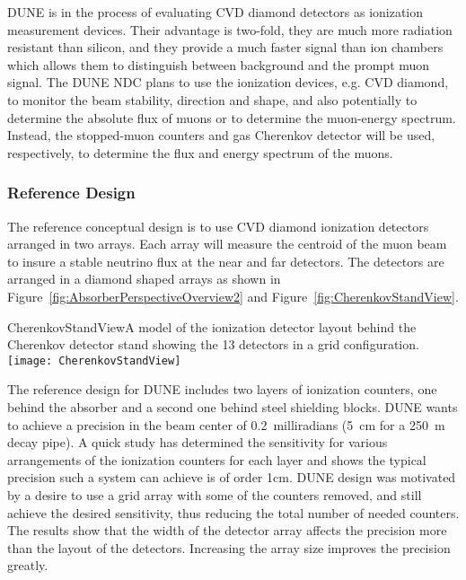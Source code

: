 DUNE is in the process of evaluating CVD diamond detectors
as ionization measurement devices. Their advantage is two-fold, they are much more
radiation resistant than silicon, and they provide a much faster signal than ion chambers
which allows them to distinguish between background and the prompt muon signal. 
The DUNE NDC plans to use the ionization devices, e.g. CVD diamond, to monitor
the beam stability, direction and shape, 
and also potentially to determine the absolute flux of muons or to determine the 
muon-energy spectrum. Instead, the stopped-muon counters %
and gas Cherenkov detector %
will be used, respectively, to determine the flux and energy
spectrum of the muons. 

\subsubsection{Reference Design}

The reference conceptual design is to use CVD diamond ionization detectors arranged in two
arrays. Each array will measure the centroid of the muon beam to insure a stable neutrino flux
at the near and far detectors. The detectors are arranged in a diamond shaped arrays as shown in 
Figure~\ref{fig:AbsorberPerspectiveOverview2} and Figure~\ref{fig:CherenkovStandView}.

\begin{cdrfigure}{CherenkovStandView}{A model of the ionization detector layout behind the Cherenkov detector stand showing the 13 detectors in a grid configuration.}
\texttt{[image: CherenkovStandView]}

\end{cdrfigure}

The reference design for DUNE includes two layers of ionization counters, one 
behind the absorber and a second one behind steel shielding blocks. 
DUNE wants to achieve a precision in the beam center of 0.2~milliradians
(5~cm for a 250~m decay pipe). A quick study has 
determined the sensitivity for various arrangements of the ionization counters for each layer and
shows the typical precision such a system can achieve is of order 1cm.
DUNE design was motivated by a desire to use a grid array with some of the 
counters removed, and still achieve the desired sensitivity, 
thus reducing the total number of needed counters.
The results show that the width of the detector array affects the
precision more than the layout of the detectors. Increasing the array
size improves the precision greatly. 

